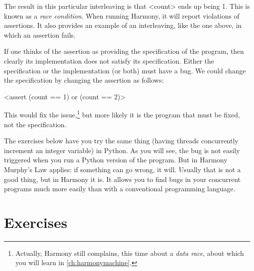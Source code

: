 \documentclass{report}
\newenvironment{code}{
\tcolorbox
}{
\endtcolorbox
}
\begin{document}
The result in this particular interleaving is that <{count}> ends up
being 1.
This is known as a \emph{race condition}.
%
When running Harmony, it will
report violations of assertions.  It also provides an example
of an interleaving, like the one above, in which an assertion fails.

%

If one thinks of the assertion as providing the specification of the
program, then clearly its implementation does not satisfy its specification.
Either the specification or the implementation (or both) must have a bug.
We could change the specification by changing the assertion as follows:

\begin{code}
<{assert (count == 1) or (count == 2)}>
\end{code}

This would fix the issue,\footnote{Actually, Harmony still complains, this time
about a \emph{data race}, about which you will learn in \autoref{ch:harmonymachine}.}
but more likely it is the program that must be fixed, not the specification.

The exercises below have you try the same thing (having threads
concurrently increment an integer variable) in Python.  As you will
see, the bug is not easily triggered when you run a Python version of
the program.  But in Harmony Murphy's Law applies:
if something can go wrong, it will.  Usually that is not a good thing,
but in Harmony it is.  It allows you to find bugs in your concurrent
programs much more easily than with a conventional programming language.

\section*{Exercises}

\end{document}
